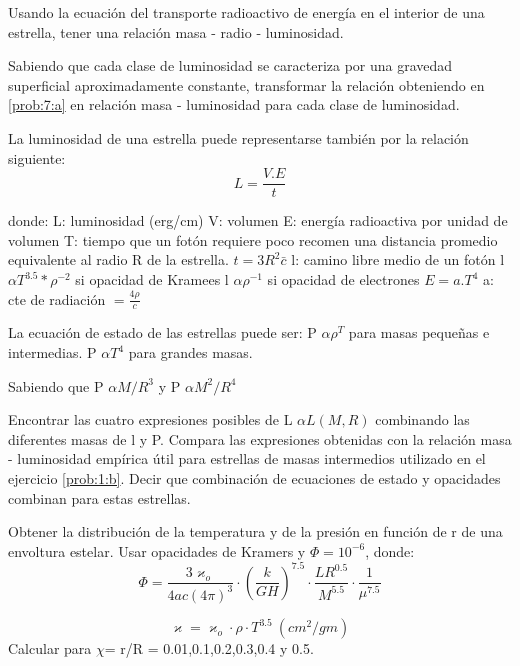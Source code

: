\documentclass[12pt,a4paper]{practice}
\begin{document}
    \begin{problem}\label{prob:7}
        \begin{ppart}\label{prob:7:a}
        Usando la ecuación del transporte radioactivo de energía en el interior de una estrella, tener una relación masa - radio - luminosidad.
        \end{ppart}

        \begin{ppart}\label{prob:7:b}
        Sabiendo que cada clase de luminosidad se caracteriza por una gravedad superficial aproximadamente constante, transformar la relación obteniendo en \ref{prob:7:a} en relación masa - luminosidad para cada clase de luminosidad.
        \end{ppart}
    \end{problem}

    \begin{problem}\label{prob:8}
    La luminosidad de una estrella puede representarse también por la relación siguiente:
            $$
            L = \frac{V.E}{t}
            $$

        donde:  L: luminosidad (erg/cm)
                V: volumen
                E: energía radioactiva por unidad de volumen
                T: tiempo que un fotón requiere poco recomen una distancia promedio equivalente al radio R de la estrella.
        $t= 3R^{2}\bar c$
        l: camino libre medio de un fotón
        l $\alpha T^{3.5}* \rho^{-2}$ si opacidad de Kramees
        l $\alpha \rho^{-1}$ si opacidad de electrones
        $E = a.T^{4}$   a: cte de radiación $= \frac{4 \rho}{c} $

        La ecuación de estado de las estrellas puede ser:
        P $\alpha \rho^{T}$ para masas pequeñas e intermedias.
        P $\alpha T^{4}$ para grandes masas.

        Sabiendo que
        P $\alpha M/R^{3}$ y P $\alpha M^{2}/R^{4}$

    Encontrar las cuatro expresiones posibles de L $\alpha L(M,R)$ combinando las diferentes masas de l y P. Compara las expresiones obtenidas con la relación masa - luminosidad empírica útil para estrellas de masas intermedios utilizado en el ejercicio \ref{prob:1:b}.  Decir que combinación de ecuaciones de estado y opacidades combinan para estas estrellas.
    \end{problem}

    \begin{problem}\label{prob:9}
    Obtener la distribución de la temperatura y de la presión en función de r de una envoltura estelar. Usar opacidades de Kramers y $\Phi = 10^{-6}$, donde:
    $$
        \Phi = \frac{3 \varkappa_o}{4ac(4\pi)^{3}}\cdot \left(\frac{k}{GH}\right)^{7.5}\cdot \frac{LR^{0.5}}{M^{5.5}}\cdot \frac{1}{\mu^{7.5}}
    $$

    $$
        \varkappa = \varkappa_o \cdot \rho\cdot T^{3.5}\ (cm^{2}/ gm)
    $$
    Calcular para $\chi$= r/R = 0.01,0.1,0.2,0.3,0.4 y 0.5.

    \end{problem}
\end{document}
